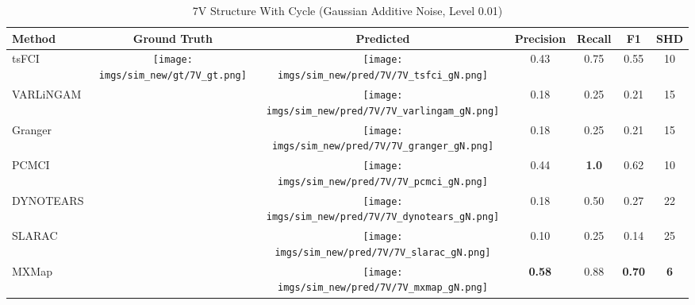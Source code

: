 \begin{table}[htb]
\begin{tabular}{l|c|c|c|c|c|c}
Method    & Ground Truth      & Predicted & Precision     & Recall       & F1            & SHD        \\ \hline
tsFCI     & \multirow{7}{*}[-9em]{\begin{minipage}{.17\linewidth} \centering \texttt{[image: imgs/sim\_new/gt/7V\_gt.png]} \end{minipage}} &  \begin{minipage}{.17\linewidth} \centering \texttt{[image: imgs/sim\_new/pred/7V/7V\_tsfci\_gN.png]} \end{minipage}  & 0.43          & 0.75         & 0.55          & 10         \\
VARLiNGAM &                   &  \begin{minipage}{.17\linewidth} \centering \texttt{[image: imgs/sim\_new/pred/7V/7V\_varlingam\_gN.png]} \end{minipage}   & 0.18          & 0.25         & 0.21          & 15         \\
Granger   &                   & \begin{minipage}{.17\linewidth} \centering \texttt{[image: imgs/sim\_new/pred/7V/7V\_granger\_gN.png]} \end{minipage}  & 0.18          & 0.25         & 0.21          & 15         \\
PCMCI     &                   &  \begin{minipage}{.17\linewidth} \centering \texttt{[image: imgs/sim\_new/pred/7V/7V\_pcmci\_gN.png]} \end{minipage}   & 0.44          & \textbf{1.0} & 0.62          & 10         \\
DYNOTEARS &                   & \begin{minipage}{.17\linewidth} \centering \texttt{[image: imgs/sim\_new/pred/7V/7V\_dynotears\_gN.png]} \end{minipage}  & 0.18          & 0.50         & 0.27          & 22         \\
SLARAC    &                   &  \begin{minipage}{.17\linewidth} \centering \texttt{[image: imgs/sim\_new/pred/7V/7V\_slarac\_gN.png]} \end{minipage}  & 0.10          & 0.25         & 0.14          & 25         \\ \cline{1-1} \cline{3-7} 
MXMap     &                   &   \begin{minipage}{.17\linewidth} \centering \texttt{[image: imgs/sim\_new/pred/7V/7V\_mxmap\_gN.png]} \end{minipage}    & \textbf{0.58} & 0.88         & \textbf{0.70} & \textbf{6}
\end{tabular}
\caption{7V Structure With Cycle (Gaussian Additive Noise, Level 0.01)}
\label{tab:7V_gN}
\end{table}